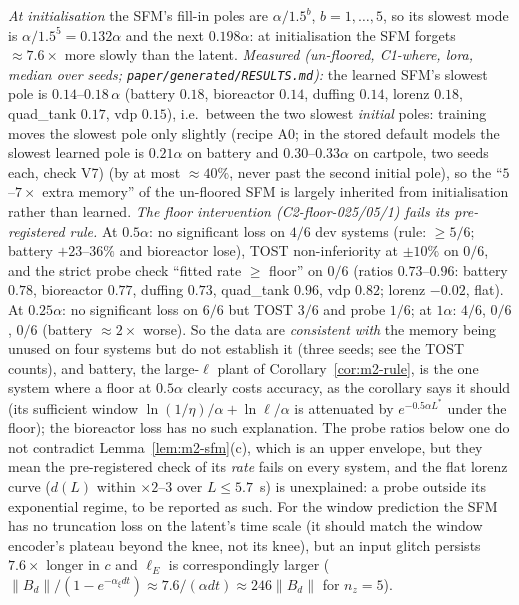 \emph{At initialisation} the SFM's fill-in poles are $\alpha/1.5^{b}$, $b=1,\dots,5$, so its slowest mode is
$\alpha/1.5^5=0.132\alpha$ and the next $0.198\alpha$: at initialisation the SFM forgets $\approx7.6\times$ more slowly
than the latent. \emph{Measured (un-floored, C1-where, lora, median over seeds; \texttt{paper/generated/RESULTS.md}):}
the learned SFM's slowest pole is $0.14$--$0.18\,\alpha$ (battery $0.18$, bioreactor $0.14$, duffing $0.14$, lorenz $0.18$,
quad\_tank $0.17$, vdp $0.15$), i.e.\ between the two slowest \emph{initial} poles: training moves the slowest pole
only slightly  (recipe A0; in the stored default models the slowest learned pole is
$0.21\alpha$ on battery and $0.30$--$0.33\alpha$ on cartpole, two seeds each, check V7) (by at most $\approx40\%$, never past the second initial pole), so the ``$5$--$7\times$ extra memory'' of the
un-floored SFM is largely inherited from initialisation rather than learned.
\emph{The floor intervention (C2-floor-025/05/1) fails its pre-registered rule.} At $0.5\alpha$: no significant loss on
$4/6$ dev systems (rule: $\ge5/6$; battery $+23$--$36\%$ and bioreactor lose), TOST non-inferiority at $\pm10\%$ on $0/6$,
and the strict probe check ``fitted rate $\ge$ floor'' on $0/6$ (ratios $0.73$--$0.96$: battery $0.78$, bioreactor $0.77$,
duffing $0.73$, quad\_tank $0.96$, vdp $0.82$; lorenz $-0.02$, flat). At $0.25\alpha$: no significant loss on $6/6$ but
TOST $3/6$ and probe $1/6$; at $1\alpha$: $4/6$, $0/6$, $0/6$ (battery $\approx2\times$ worse). So the data are
\emph{consistent with} the memory being unused on four systems but do not establish it (three seeds; see the TOST counts),
and battery, the large-$\ell$ plant of Corollary~\ref{cor:m2-rule}, is the one system where a floor at $0.5\alpha$ clearly
costs accuracy, as the corollary says it should (its sufficient window $\ln(1/\eta)/\alpha+\ln\ell/\alpha$ is attenuated by
$e^{-0.5\alpha L^*}$ under the floor); the bioreactor loss has no such explanation. The probe ratios below one do not
contradict Lemma~\ref{lem:m2-sfm}(c), which is an upper envelope, but they mean the pre-registered check of its
\emph{rate} fails on every system, and the flat lorenz curve ($d(L)$ within $\times2$--$3$ over $L\le5.7$~s) is unexplained:
a probe outside its exponential regime, to be reported as such. For the window prediction the SFM has no truncation loss
on the latent's time scale (it
should match the window encoder's plateau beyond the knee, not its knee), but an input glitch persists $7.6\times$ longer
in $c$ and $\ell_E$ is correspondingly larger ($\|B_d\|/(1-e^{-\alpha_\xi dt})\approx7.6/(\alpha dt)\approx246\|B_d\|$
for $n_z=5$).

